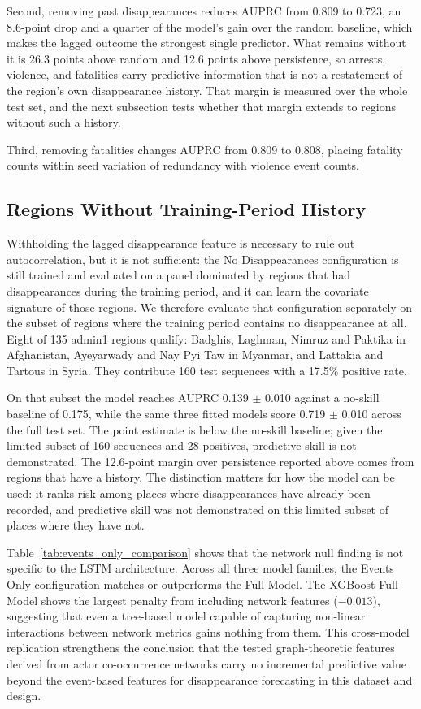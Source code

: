 \documentclass[pdflatex,sn-mathphys-num]{sn-jnl}%
\theoremstyle{thmstyleone}%
\theoremstyle{thmstyletwo}%
\theoremstyle{thmstylethree}%
\begin{document}
Second, removing past disappearances reduces AUPRC from 0.809 to 0.723, an 8.6-point drop and a quarter of the model's gain over the random baseline, which makes the lagged outcome the strongest single predictor. What remains without it is 26.3 points above random and 12.6 points above persistence, so arrests, violence, and fatalities carry predictive information that is not a restatement of the region's own disappearance history. That margin is measured over the whole test set, and the next subsection tests whether that margin extends to regions without such a history.

Third, removing fatalities changes AUPRC from 0.809 to 0.808, placing fatality counts within seed variation of redundancy with violence event counts.

\subsection{Regions Without Training-Period History}\label{sec:zero_history}

Withholding the lagged disappearance feature is necessary to rule out autocorrelation, but it is not sufficient: the No Disappearances configuration is still trained and evaluated on a panel dominated by regions that had disappearances during the training period, and it can learn the covariate signature of those regions. We therefore evaluate that configuration separately on the subset of regions where the training period contains no disappearance at all. Eight of 135 admin1 regions qualify: Badghis, Laghman, Nimruz and Paktika in Afghanistan, Ayeyarwady and Nay Pyi Taw in Myanmar, and Lattakia and Tartous in Syria. They contribute 160 test sequences with a 17.5\% positive rate.

On that subset the model reaches AUPRC 0.139 $\pm$ 0.010 against a no-skill baseline of 0.175, while the same three fitted models score 0.719 $\pm$ 0.010 across the full test set. The point estimate is below the no-skill baseline; given the limited subset of 160 sequences and 28 positives, predictive skill is not demonstrated. The 12.6-point margin over persistence reported above comes from regions that have a history. The distinction matters for how the model can be used: it ranks risk among places where disappearances have already been recorded, and predictive skill was not demonstrated on this limited subset of places where they have not.

Table~\ref{tab:events_only_comparison} shows that the network null finding is not specific to the LSTM architecture. Across all three model families, the Events Only configuration matches or outperforms the Full Model. The XGBoost Full Model shows the largest penalty from including network features ($-0.013$), suggesting that even a tree-based model capable of capturing non-linear interactions between network metrics gains nothing from them. This cross-model replication strengthens the conclusion that the tested graph-theoretic features derived from actor co-occurrence networks carry no incremental predictive value beyond the event-based features for disappearance forecasting in this dataset and design.
\end{document}
